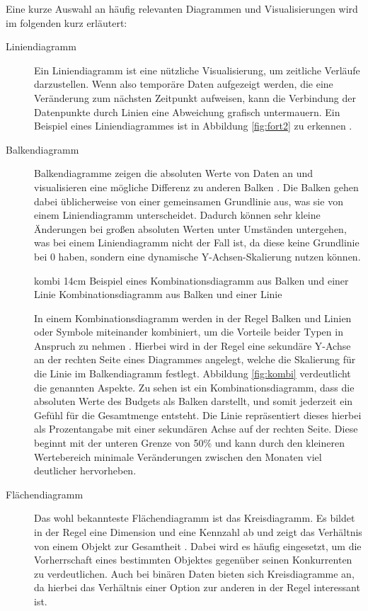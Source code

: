 Eine kurze Auswahl an häufig relevanten Diagrammen und Visualisierungen wird im folgenden kurz erläutert:
\begin{description}
\item[Liniendiagramm] Ein Liniendiagramm ist eine nützliche Visualisierung, um zeitliche Verläufe darzustellen. 
Wenn also temporäre Daten aufgezeigt werden, die eine Veränderung zum nächsten Zeitpunkt aufweisen, kann die Verbindung der Datenpunkte durch Linien eine Abweichung grafisch untermauern. 
Ein Beispiel eines Liniendiagrammes ist in Abbildung \ref{fig:fort2} zu erkennen \cite[S.77]{Engels.2015}.

\item[Balkendiagramm] Balkendiagramme zeigen die absoluten Werte von Daten an und visualisieren eine mögliche Differenz zu anderen Balken \cite[S.54]{Bounford.2001}.
Die Balken gehen dabei üblicherweise von einer gemeinsamen Grundlinie aus, was sie von einem Liniendiagramm unterscheidet.
Dadurch können sehr kleine Änderungen bei großen absoluten Werten unter Umständen untergehen, was bei einem Liniendiagramm nicht der Fall ist, da diese keine Grundlinie bei 0 haben, sondern eine dynamische Y-Achsen-Skalierung nutzen können.

\bild
{kombi}
{14cm}
{Beispiel eines Kombinationsdiagramm aus Balken und einer Linie}
{Kombinationsdiagramm aus Balken und einer Linie}

In einem Kombinationsdiagramm werden in der Regel Balken und Linien oder Symbole miteinander kombiniert, um die Vorteile beider Typen in Anspruch zu nehmen \cite[S.84]{Bounford.2001}.
Hierbei wird in der Regel eine sekundäre Y-Achse an der rechten Seite eines Diagrammes angelegt, welche die Skalierung für die Linie im Balkendiagramm festlegt.
Abbildung \ref{fig:kombi} verdeutlicht die genannten Aspekte.
Zu sehen ist ein Kombinationsdiagramm, dass die absoluten Werte des Budgets als Balken darstellt, und somit jederzeit ein Gefühl für die Gesamtmenge entsteht.
Die Linie repräsentiert dieses hierbei als Prozentangabe mit einer sekundären Achse auf der rechten Seite.
Diese beginnt mit der unteren Grenze von 50\% und kann durch den kleineren Wertebereich minimale Veränderungen zwischen den Monaten viel deutlicher hervorheben.

\item[Flächendiagramm] Das wohl bekannteste Flächendiagramm ist das Kreisdiagramm. 
Es bildet in der Regel eine Dimension und eine Kennzahl ab und zeigt das Verhältnis von einem Objekt zur Gesamtheit \cite[S.72]{Bounford.2001}.
Dabei wird es häufig eingesetzt, um die Vorherrschaft eines bestimmten Objektes gegenüber seinen Konkurrenten zu verdeutlichen.
Auch bei binären Daten bieten sich Kreisdiagramme an, da hierbei das Verhältnis einer Option zur anderen in der Regel interessant ist.


\end{description}
